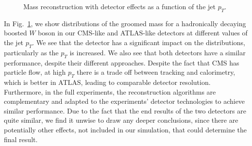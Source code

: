 \documentclass[11pt,letterpaper]{article}
\begin{document}
\begin{figure}
  \caption{Mass reconstruction with detector effects as a function of the jet $p_T$.}
  \label{jetsub_2prong_fig:mass-detector}
\end{figure}

In Fig.~\ref{jetsub_2prong_fig:mass-detector}, we show distributions of the groomed mass for a hadronically decaying boosted $W$ boson in our CMS-like and ATLAS-like detectors at different values of the jet $p_T$.
%
We see that the detector has a significant impact on the distributions, particularly as the $p_T$ is increased.
%
We also see that both detectors have a similar performance, despite their different approaches.
%
Despite the fact that CMS has particle flow, at high $p_T$ there is a trade off between tracking and calorimetry, which is better in ATLAS, leading to comparable detector resolution.
%
Furthermore, in the full experiments, the reconstruction algorithms are complementary and adapted to the experiments' detector technologies to achieve similar performance.
%
Due to the fact that the end results of the two detectors are quite similar, we find it unwise to draw any deeper conclusions, since there are potentially other effects, not included in our simulation, that could determine the final result.
\end{document}

